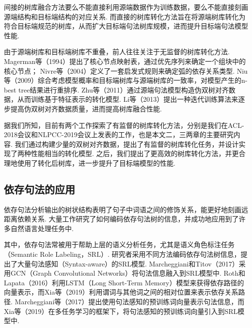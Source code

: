 \begin{enumerate}
          间接的树库融合方法要么不能直接利用源端数据作为训练数据，要么不能直接刻画源端结构和目标端结构的对应关系. 而直接的树库转化方法旨在将源端树库转化为符合目标端规范的树库，从而扩大目标端句法树库规模，进而提升目标端句法模型性能.
          
          
          由于源端树库和目标端树库不重叠，前人往往关注于无监督的树库转化方法.
          Magerman等（1994）提出了核心节点映射表，通过优先序列来确定一个组块中的核心节点；
          Nivre等（2004）定义了一套启发式规则来确定弧的依存关系类型.
          Niu等（2009）综合考虑模型概率和目标端树库与源端树库的一致率，对模型产生的n-best tree结果进行重排序.
          Zhu等（2011）通过源端句法模型构造伪双树对齐数据，从而训练基于特征表示的转化模型.
          Li等（2013）提出一种迭代训练算法来逐步提高伪双树对齐数据质量，进而提高树库融合性能.
          
          据我们所知，目前有两个工作探索了有监督的树库转化方法，分别是我们在ACL-2018会议和NLPCC-2019会议上发表的工作，也是本文二，三两章的主要研究内容. 我们通过构建少量的双树对齐数据，提出了有监督的树库转化任务，并设计实现了两种性能相当的转化模型. 之后，我们提出了更高效的树库转化方法，并更合理地使用了转化后树库，进一步提升了目标端模型的性能.
          
\end{enumerate}

\subsection{依存句法的应用}
依存句法分析输出的树状结构表明了句子中词语之间的修饰关系，能更好地刻画远距离依赖关系.
大量工作研究了如何编码依存句法树的信息，并成功地应用到了许多自然语言处理任务中.

其中，依存句法常被用于帮助上层的语义分析任务，尤其是语义角色标注任务（Semantic Role Labeling，SRL）. 研究者采用不同方法编码依存句法树信息，提出了大量句法感知（Syntax-aware）的SRL模型.
Marcheggiani和Titov（2017）采用GCN（Graph Convolutional Networks）将句法信息融入到SRL模型中.
Roth和Lapata（2016）利用LSTM（Long Short-Term Memory）模型来获得依存路径的向量表示，而Xia等（2019）利用谓词与其他词之间的相对位置来表示依存关系路径.
Marcheggiani等（2017）提出使用句法感知的预训练词向量表示句法信息，而Xia等（2019）在多任务学习的框架下，将句法感知的预训练词向量引入到SRL模型中. %

